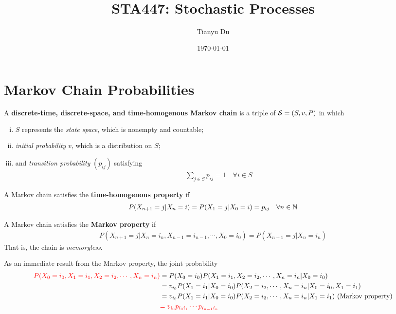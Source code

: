 \documentclass{article}
\title{STA447: Stochastic Processes}
\date{\today}
\author{Tianyu Du}
\begin{document}
    \maketitle
    \tableofcontents
    \newpage
    \section{Markov Chain Probabilities}
    
    \begin{definition}
    	A \textbf{discrete-time, discrete-space, and time-homogenous Markov chain} is a triple of $\mathcal{{S}} = (S, v, P)$ in which
    	\begin{enumerate}[(i)]
    		\item $S$ represents the \emph{state space}, which is nonempty and countable;
    		\item \emph{initial probability} $v$, which is a distribution on $S$;
    		\item and \emph{transition probability} $(p_{ij})$ satisfying
    		\begin{align}
    			\sum_{j \in S} p_{ij} = 1\quad \forall i \in S
    		\end{align}
    	\end{enumerate}
    \end{definition}
    
    \begin{definition}
    	A Markov chain satisfies the \textbf{time-homogenous property} if
    	\begin{align}
    		P(X_{n+1}=j|X_n=i) = P(X_1=j|X_0=i) = p_{ij}\quad \forall n \in \mathbb{N}
    	\end{align}
    \end{definition}
    
    \begin{definition}
    	A Markov chain satisfies the \textbf{Markov property} if
    	\begin{align}
    		P(X_{n+1}=j|X_n=i_n, X_{n-1}=i_{n-1}, \cdots, X_0=i_0) = P(X_{n+1}=j|X_n=i_n)
    	\end{align}
    	That is, the chain is \emph{memoryless}.
    \end{definition}
    
    \begin{proposition}
    	As an immediate result from the Markov property, the joint probability
    	\begin{align}
    		\textcolor{red}{P(X_0=i_0, X_1=i_1, X_2=i_2, \cdots, X_n=i_n)}
    		&= P(X_0=i_0) P(X_1=i_1, X_2=i_2, \cdots, X_n=i_n|X_0=i_0) \\
    		&= v_{i_0} P(X_1=i_1|X_0=i_0) P(X_2=i_2, \cdots, X_n=i_n|X_0=i_0, X_1=i_1) \\
    		&= v_{i_0} P(X_1=i_1|X_0=i_0) P(X_2=i_2, \cdots, X_n=i_n|X_1=i_1) \text{{ (Markov property)}}\\
    		&\textcolor{red}{= v_{i_0} p_{i_0 i_1} \cdots p_{i_{n-1}i_n}}
    	\end{align}
    \end{proposition}
    
\end{document}

